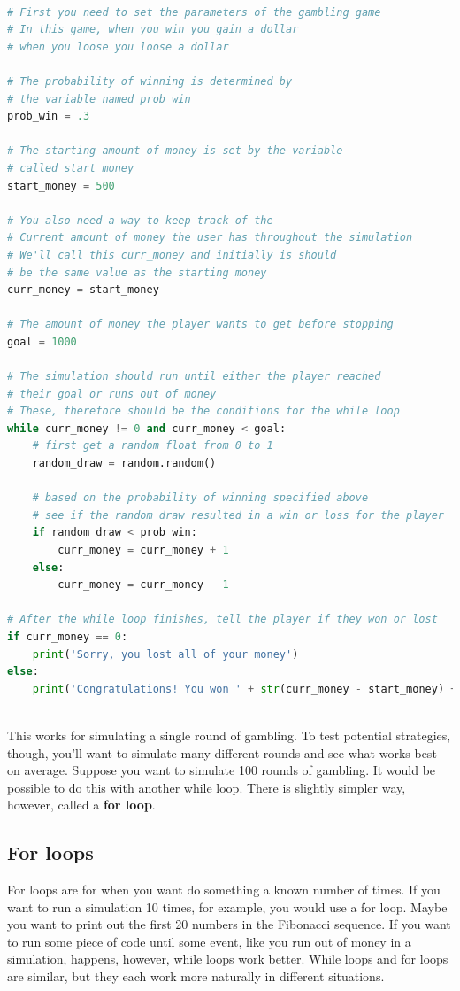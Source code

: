 \documentclass[]{article}
\begin{document}
\begin{lstlisting}[language=python]

# First you need to set the parameters of the gambling game
# In this game, when you win you gain a dollar
# when you loose you loose a dollar

# The probability of winning is determined by 
# the variable named prob_win
prob_win = .3

# The starting amount of money is set by the variable
# called start_money
start_money = 500

# You also need a way to keep track of the 
# Current amount of money the user has throughout the simulation
# We'll call this curr_money and initially is should 
# be the same value as the starting money
curr_money = start_money

# The amount of money the player wants to get before stopping
goal = 1000

# The simulation should run until either the player reached 
# their goal or runs out of money
# These, therefore should be the conditions for the while loop
while curr_money != 0 and curr_money < goal:
    # first get a random float from 0 to 1
    random_draw = random.random()
    
    # based on the probability of winning specified above
    # see if the random draw resulted in a win or loss for the player
    if random_draw < prob_win:
        curr_money = curr_money + 1
    else:
        curr_money = curr_money - 1
        
# After the while loop finishes, tell the player if they won or lost
if curr_money == 0:
    print('Sorry, you lost all of your money')
else:
    print('Congratulations! You won ' + str(curr_money - start_money) + 'dollars.')
    

\end{lstlisting}

This works for simulating a single round of gambling. To test potential strategies, though, you'll want to simulate many different rounds and see what works best on average. Suppose you want to simulate 100 rounds of gambling. It would be possible to do this with another while loop.  There is slightly simpler way, however, called a \textbf{for loop}.

\subsection{For loops}

For loops are for when you want do something a known number of times. If you want to run a simulation 10 times, for example, you would use a for loop.  Maybe you want to print out the first 20 numbers in the Fibonacci sequence. If you want to run some piece of code until some event, like you run out of money in a simulation, happens, however, while loops work better. While loops and for loops are similar, but they each work more naturally in different situations. 
\end{document}
